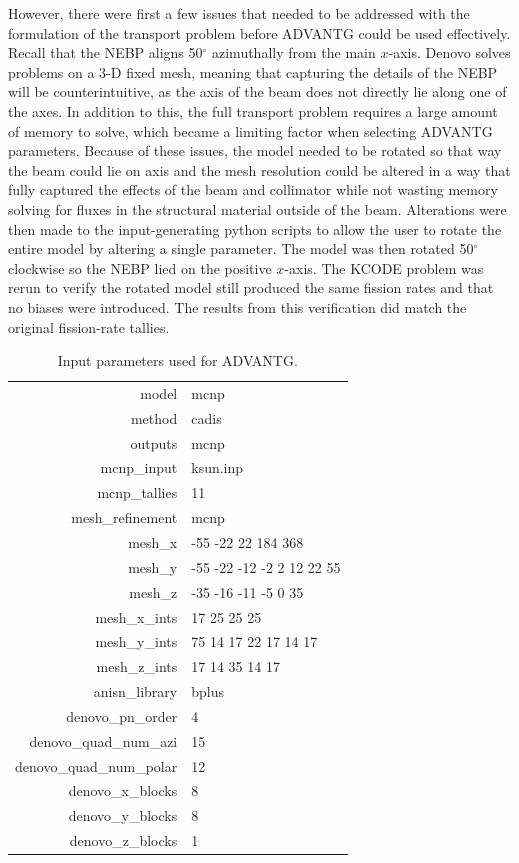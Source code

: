 However, there were first a few issues that needed to be addressed with the formulation of the transport problem before ADVANTG could be used effectively.
Recall that the NEBP aligns 50$^{\circ}$ azimuthally from the main $x$-axis.
Denovo \cite{evans2010denovo} solves problems on a 3-D fixed mesh, meaning that capturing the details of the NEBP will be counterintuitive, as the axis of the beam does not directly lie along one of the axes.
In addition to this, the full transport problem requires a large amount of memory to solve, which became a limiting factor when selecting ADVANTG parameters.
Because of these issues, the model needed to be rotated so that way the beam could lie on axis and the mesh resolution could be altered in a way that fully captured the effects of the beam and collimator while not wasting memory solving for fluxes in the structural material outside of the beam.
Alterations were then made to the input-generating python scripts to allow the user to rotate the entire model by altering a single parameter.
The model was then rotated 50$^{\circ}$ clockwise so the NEBP lied on the positive $x$-axis.
The KCODE problem was rerun to verify the rotated model still produced the same fission rates and that no biases were introduced.
The results from this verification did match the original fission-rate tallies.


\begin{table}[h]\centering
\label{tab:advantg_params}
\caption{Input parameters used for ADVANTG.}
\begin{tabular}{ r | l }
\toprule
model                     &   mcnp\\
method                    &   cadis\\
outputs                   &   mcnp\\
mcnp\_input               &   ksun.inp\\
mcnp\_tallies             &   11\\
mesh\_refinement          &   mcnp\\
mesh\_x                   &   -55 -22 22 184 368\\
mesh\_y                   &   -55 -22 -12 -2 2 12 22 55\\
mesh\_z                   &   -35 -16 -11 -5 0 35\\
mesh\_x\_ints             &   17 25 25 25\\
mesh\_y\_ints             &   75 14 17 22 17 14 17\\
mesh\_z\_ints             &   17 14 35 14 17\\
anisn\_library            &   bplus\\
denovo\_pn\_order         &   4\\
denovo\_quad\_num\_azi    &   15\\
denovo\_quad\_num\_polar  &   12\\
denovo\_x\_blocks         &   8\\
denovo\_y\_blocks         &   8\\
denovo\_z\_blocks         &   1\\
\end{tabular}
\end{table}

